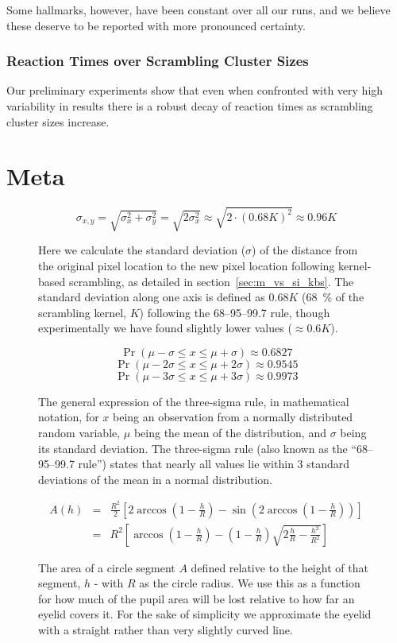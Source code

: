 	Some hallmarks, however, have been constant over all our runs, and we believe these deserve to be reported with more pronounced certainty.
	\subsection{Reaction Times over Scrambling Cluster Sizes}
	    Our preliminary experiments show that even when confronted with very high variability in results there is a robust decay of reaction times as scrambling cluster sizes increase. 
\chapter{Meta}
    \begin{figure}[H]
	\[ \sigma_{x,y} = \sqrt{\sigma_{x}^{2}+\sigma_{y}^{2}} = \sqrt{2\sigma_{x}^{2}} \approx \sqrt{2 \cdot (0.68 K)^{2}} \approx 0.96K\]
	\caption{Here we calculate the standard deviation ($\sigma$) of the distance from the original pixel location to the new pixel location following kernel-based scrambling, as detailed in section~\ref{sec:m_vs_si_kbs}. The standard deviation along one axis is defined as $0.68K$ (\SI{68}{\percent} of the scrambling kernel, $K$) following the 68–95–99.7 rule, though experimentally we have found slightly lower values ($\approx 0.6K$).}
	\label{eq:lrgn}
    \end{figure}
    \begin{figure}[H]
	\[\Pr(\mu - \sigma \le x \le \mu + \sigma) \approx 0.6827 \]
	\[\Pr(\mu - 2\sigma \le x \le \mu + 2\sigma) \approx 0.9545 \]
	\[\Pr(\mu - 3\sigma \le x \le \mu + 3\sigma) \approx 0.9973 \]
	\caption{The general expression of the three-sigma rule, in mathematical notation, for $x$ being an observation from a normally distributed random variable, $\mu$ being the mean of the distribution, and $\sigma$ being its standard deviation. The three-sigma rule (also known as the “68–95–99.7 rule”) states that nearly all values lie within 3 standard deviations of the mean in a normal distribution.}
	\label{eq:3s}
    \end{figure}
    \begin{figure}[H]
	\begin{eqnarray*}
	    A(h)&=&\frac{R^2}{2}\left[2\arccos\left(1-\frac{h}{R}\right) - \sin\left(2 \arccos\left(1-\frac{h}{R}\right)\right) \right]\\
	    &=&R^2 \left [\arccos{\left (1-\frac{h}{R}\right)} - \left (1-\frac{h}{R}\right) \sqrt{2 \frac{h}{R} - \frac{h^2}{R^2}} \right]
	\end{eqnarray*}
	\caption{The area of a circle segment $A$ defined relative to the height of that segment, $h$ - with $R$ as the circle radius. We use this as a function for how much of the pupil area will be lost relative to how far an eyelid covers it. For the sake of simplicity we approximate the eyelid with a straight rather than very slightly curved line.}
	\label{eq:cs}
    \end{figure}
    

